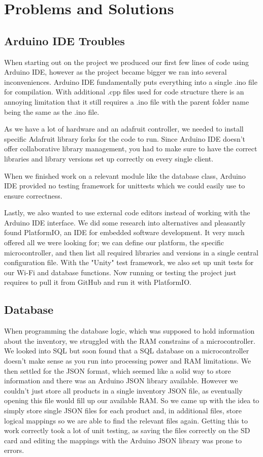 \documentclass{article}
\begin{document}
\section{Problems and Solutions}

\subsection{Arduino IDE Troubles}
When starting out on the project we produced our first few lines of code using Arduino IDE, however as the project became bigger we ran into several inconveniences.
Arduino IDE fundamentally puts everything into a single .ino file for compilation. With additional .cpp files used for code structure there is an annoying limitation that it still requires a .ino file with the parent folder name being the same as the .ino file.

As we have a lot of hardware and an adafruit controller, we needed to install specific Adafruit library forks for the code to run.
Since Arduino IDE doesn't offer collaborative library management, you had to make sure to have the correct libraries and library versions set up correctly on every single client.

When we finished work on a relevant module like the database class, Arduino IDE provided no testing framework for unittests which we could easily use to ensure correctness.

Lastly, we also wanted to use external code editors instead of working with the Arduino IDE interface.
We did some research into alternatives and pleasantly found PlatformIO, an IDE for embedded software development.
It very much offered all we were looking for; we can define our platform, the specific microcontroller, and then list all required libraries and versions in a single central configuration file.
With the "Unity" test framework, we also set up unit tests for our Wi-Fi and database functions.
Now running or testing the project just requires to pull it from GitHub and run it with PlatformIO.

\subsection{Database}
When programming the database logic, which was supposed to hold information about the inventory, we struggled with the RAM constrains of a microcontroller.
We looked into SQL but soon found that a SQL database on a microcontroller doesn't make sense as you run into processing power and RAM limitations.
We then settled for the JSON format, which seemed like a solid way to store information and there was an Arduino JSON library available.
However we couldn't just store all products in a single inventory JSON file, as eventually opening this file would fill up our available RAM.
So we came up with the idea to simply store single JSON files for each product and, in additional files, store logical mappings so we are able to find the relevant files again.
Getting this to work correctly took a lot of unit testing, as saving the files correctly on the SD card and editing the mappings with the Arduino JSON library was prone to errors.
\end{document}
